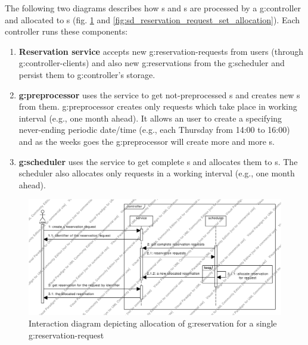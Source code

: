 The following two diagrams describes how s and s are processed by a \gls{g:controller} and allocated to s (fig. \ref{fig:sd_reservation_request_allocation} and \ref{fig:sd_reservation_request_set_allocation}). Each controller runs these components:
\begin{enumerate}
\item \textbf{Reservation service} accepts new \glspl{g:reservation-request} from users (through \glspl{g:controller-client}) and also new \glspl{g:reservation} from the \gls{g:scheduler} and persist them to \gls{g:controller}'s storage.
\item \textbf{\Gls{g:preprocessor}} uses the service to get not-preprocessed s and creates new s from them. \Gls{g:preprocessor} creates only requests which take place in working interval (e.g., one month ahead). It allows an user to create a  specifying never-ending periodic date/time (e.g., each Thursday from 14:00 to 16:00) and as the weeks goes the \gls{g:preprocessor} will create more and more s.
\item \textbf{\Gls{g:scheduler}} uses the service to get complete s and allocates them to s. The scheduler also allocates only requests in a working interval (e.g., one month ahead).
\end{enumerate}

\begin{figure}[ht!]
\includegraphics[width=\textwidth]{diagrams/sd_reservation_request_allocation}
\caption{Interaction diagram depicting allocation of \gls{g:reservation} for a single \gls{g:reservation-request}}
\label{fig:sd_reservation_request_allocation}
\end{figure}

